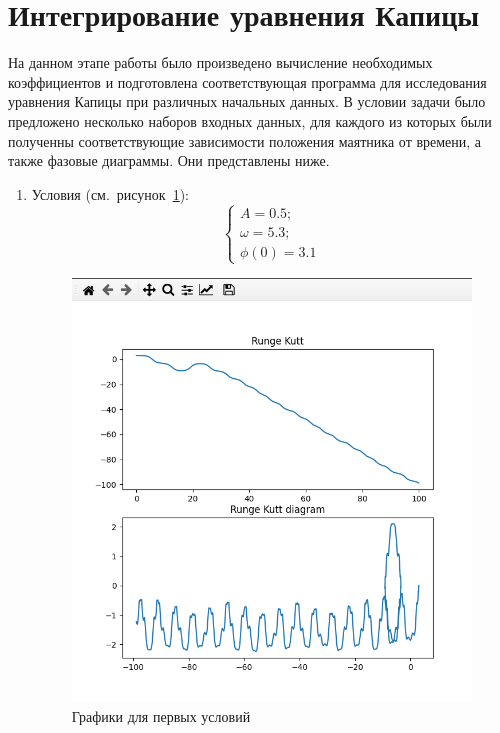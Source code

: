 \documentclass[a4paper,12pt]{article}
\begin{document}
	\section{Интегрирование уравнения Капицы}
	На данном этапе работы было произведено вычисление необходимых 
	коэффициентов и подготовлена соответствующая программа для исследования 
	уравнения Капицы при различных начальных данных. В условии задачи было 
	предложено несколько наборов входных данных, для каждого из которых были 
	полученны соответствующие зависимости положения маятника от времени, а 
	также фазовые диаграммы. Они представлены ниже.
	\begin{enumerate}
		\item Условия (см.~рисунок~\ref{fig:1_praq}):
		\begin{equation}
			\begin{cases}
				A = 0.5; \\
				\omega = 5.3; \\
				\phi(0) = 3.1
			\end{cases}
		\end{equation}

		\newpage

		\begin{figure}[ht!]
			\begin{center}
			\includegraphics[scale=0.3]{sources/1_praq.png}
			\end{center}
			\vspace*{-8mm}
			\caption{Графики для первых условий}\label{fig:1_praq}
	  	\end{figure}


\end{enumerate}
\end{document}

